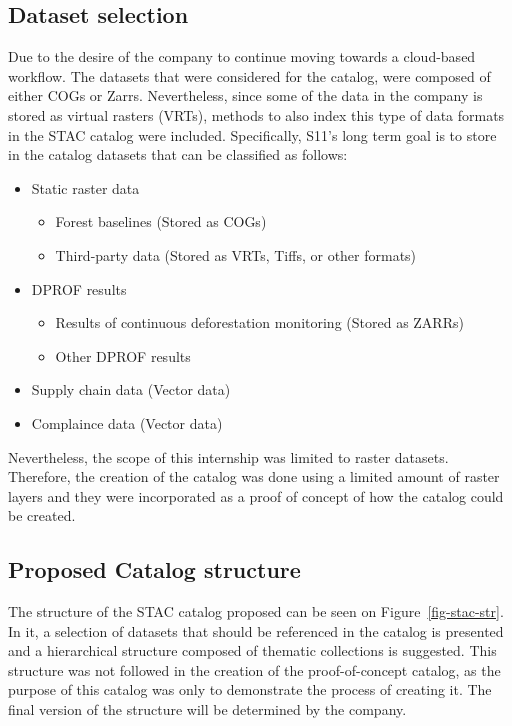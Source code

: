 \documentclass[
  oneside,
  open=any]{scrbook}
\providecommand{\tightlist}{%
  \setlength{\itemsep}{0pt}\setlength{\parskip}{0pt}}\usepackage{longtable,booktabs,array}
\begin{document}
\subsection{Dataset selection}\label{dataset-selection}

Due to the desire of the company to continue moving towards a
cloud-based workflow. The datasets that were considered for the catalog,
were composed of either COGs or Zarrs. Nevertheless, since some of the
data in the company is stored as virtual rasters (VRTs), methods to also
index this type of data formats in the STAC catalog were included.
Specifically, S11's long term goal is to store in the catalog datasets
that can be classified as follows:

\begin{itemize}
\tightlist
\item
  Static raster data

  \begin{itemize}
  \tightlist
  \item
    Forest baselines (Stored as COGs)
  \item
    Third-party data (Stored as VRTs, Tiffs, or other formats)
  \end{itemize}
\item
  DPROF results

  \begin{itemize}
  \tightlist
  \item
    Results of continuous deforestation monitoring (Stored as ZARRs)
  \item
    Other DPROF results
  \end{itemize}
\item
  Supply chain data (Vector data)
\item
  Complaince data (Vector data)
\end{itemize}

Nevertheless, the scope of this internship was limited to raster
datasets. Therefore, the creation of the catalog was done using a
limited amount of raster layers and they were incorporated as a proof of
concept of how the catalog could be created.

\subsection{Proposed Catalog
structure}\label{proposed-catalog-structure}

The structure of the STAC catalog proposed can be seen on
Figure~\ref{fig-stac-str}. In it, a selection of datasets that should be
referenced in the catalog is presented and a hierarchical structure
composed of thematic collections is suggested. This structure was not
followed in the creation of the proof-of-concept catalog, as the purpose
of this catalog was only to demonstrate the process of creating it. The
final version of the structure will be determined by the company.
\end{document}
